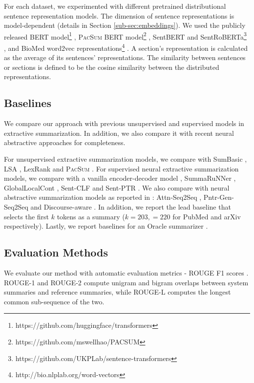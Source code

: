 \documentclass[11pt,a4paper]{article}
\begin{document}
For each dataset, we experimented with different pretrained distributional sentence representation models. The dimension of sentence representations is model-dependent (details in Section \ref{sub-sec:embeddings}).  We used the publicly released BERT model\footnote{https://github.com/huggingface/transformers} \citep{devlin2019bert}, \textsc{PacSum} BERT model\footnote{https://github.com/mswellhao/PACSUM} \citep{zheng2019sentence}, SentBERT and SentRoBERTa\footnote{https://github.com/UKPLab/sentence-transformers} \citep{reimerssentence}, and BioMed word2vec representations\footnote{http://bio.nlplab.org/word-vectors} \citep{moen2013distributional}. A section's representation is calculated as the average of its sentences' representations. The similarity between sentences or sections is defined to be the cosine similarity between the distributed representations. 

\subsection{Baselines}\label{sub-sec:baseline_models}
We compare our approach with previous unsupervised and supervised models in extractive summarization. In addition, we also compare it with recent neural abstractive approaches for completeness. 

For unsupervised extractive summarization models, we compare with SumBasic \citep{vanderwende2007beyond},  LSA \citep{steinberger2004using}, LexRank \citep{erkan2004lexrank} and \textsc{PacSum} \citep{zheng2019sentence}. For supervised neural extractive summarization models, we compare with a vanilla encoder-decoder model \citep{cheng-lapata-2016-neural}, SummaRuNNer \citep{nallapati2017summarunner}, GlobalLocalCont \citep{xiao2019extractive}, Sent-CLF and Sent-PTR \citep{subramanian2019extractive}. We also compare with neural abstractive summarization models as reported in \citet{xiao2019extractive}: Attn-Seq2Seq \citep{nallapati2016abstractive}, Pntr-Gen-Seq2Seq \citep{see2017get} and Discourse-aware \citep{cohan2018discourse}. In addition, we report the lead baseline that selects the first $k$ tokens as a summary ($k=203,=220$ for PubMed and arXiv respectively). Lastly, we report baselines for an Oracle summarizer \citep{nallapati2017summarunner}. 

\subsection{Evaluation Methods}\label{sub-sec:evalution_method}
We evaluate our method with automatic evaluation metrics - ROUGE F1 scores \citep{lin-2004-rouge}. ROUGE-1 and ROUGE-2 compute unigram and bigram overlaps between system summaries and reference summaries, while ROUGE-L computes the longest common sub-sequence of the two. 
\end{document}
